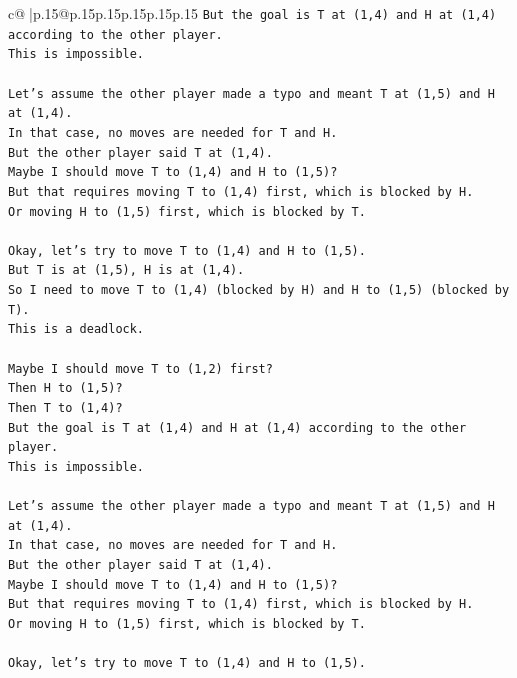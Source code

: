 \documentclass{article}
\begin{document}
{\begin{supertabular}{c@{$\;$}|p{.15\linewidth}@{}p{.15\linewidth}p{.15\linewidth}p{.15\linewidth}p{.15\linewidth}p{.15\linewidth}}
{{{\texttt{But the goal is T at (1,4) and H at (1,4) according to the other player.} \\
\texttt{This is impossible.} \\
\\ 
\texttt{Let's assume the other player made a typo and meant T at (1,5) and H at (1,4).} \\
\texttt{In that case, no moves are needed for T and H.} \\
\texttt{But the other player said T at (1,4).} \\
\texttt{Maybe I should move T to (1,4) and H to (1,5)?} \\
\texttt{But that requires moving T to (1,4) first, which is blocked by H.} \\
\texttt{Or moving H to (1,5) first, which is blocked by T.} \\
\\ 
\texttt{Okay, let's try to move T to (1,4) and H to (1,5).} \\
\texttt{But T is at (1,5), H is at (1,4).} \\
\texttt{So I need to move T to (1,4) (blocked by H) and H to (1,5) (blocked by T).} \\
\texttt{This is a deadlock.} \\
\\ 
\texttt{Maybe I should move T to (1,2) first?} \\
\texttt{Then H to (1,5)?} \\
\texttt{Then T to (1,4)?} \\
\texttt{But the goal is T at (1,4) and H at (1,4) according to the other player.} \\
\texttt{This is impossible.} \\
\\ 
\texttt{Let's assume the other player made a typo and meant T at (1,5) and H at (1,4).} \\
\texttt{In that case, no moves are needed for T and H.} \\
\texttt{But the other player said T at (1,4).} \\
\texttt{Maybe I should move T to (1,4) and H to (1,5)?} \\
\texttt{But that requires moving T to (1,4) first, which is blocked by H.} \\
\texttt{Or moving H to (1,5) first, which is blocked by T.} \\
\\ 
\texttt{Okay, let's try to move T to (1,4) and H to (1,5).} \\
}}}
\end{supertabular}}
\end{document}
